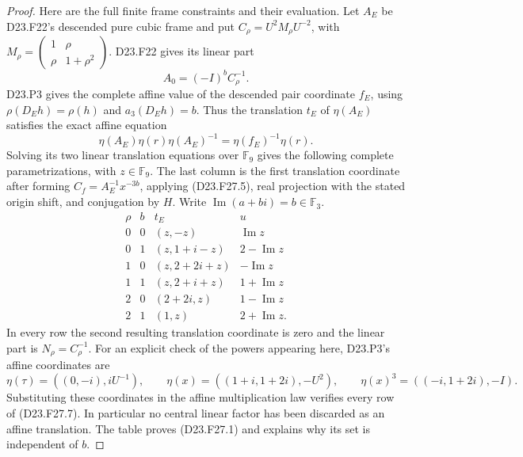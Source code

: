 \begin{proof}
Here are the full finite frame constraints and their evaluation.
Let $A_E$ be D23.F22's descended pure cubic frame and put
$C_\rho=U^2M_\rho U^{-2}$, with
$M_\rho=\left(\begin{smallmatrix}1&\rho\\\rho&1+\rho^2\end{smallmatrix}\right)$.
D23.F22 gives its linear part
\[
                  A_0=(-I)^b C_\rho^{-1}.
\]
D23.P3 gives the complete affine value of the descended pair
coordinate $f_E$, using $\rho(D_Eh)=\rho(h)$ and
$a_3(D_Eh)=b$.  Thus the translation $t_E$ of $\eta(A_E)$
satisfies the exact affine equation
\[
       \eta(A_E)\eta(r)\eta(A_E)^{-1}
                         =\eta(f_E)^{-1}\eta(r).
\tag{D23.F27.6}
\]
Solving its two linear translation equations over $\mathbb F_9$
gives the following complete parametrizations, with $z\in\mathbb F_9$.
The last column is the first translation coordinate after
forming $C_f=A_E^{-1}x^{-3b}$, applying (D23.F27.5), real
projection with the stated origin shift, and conjugation by $H$.
Write $\operatorname{Im}(a+bi)=b\in\mathbb F_3$.
\[
\begin{array}{cc|c|c}
 \rho&b&t_E&u\\\hline
 0&0&(z,-z)&\operatorname{Im}z\\
 0&1&(z,1+i-z)&2-\operatorname{Im}z\\
 1&0&(z,2+2i+z)&-\operatorname{Im}z\\
 1&1&(z,2+i+z)&1+\operatorname{Im}z\\
 2&0&(2+2i,z)&1-\operatorname{Im}z\\
 2&1&(1,z)&2+\operatorname{Im}z.
\end{array}
\tag{D23.F27.7}
\]
In every row the second resulting translation coordinate is
zero and the linear part is $N_\rho=C_\rho^{-1}$.
For an explicit check of the powers appearing here, D23.P3's
affine coordinates are
\[
 \eta(\tau)=((0,-i),iU^{-1}),\qquad
 \eta(x)=((1+i,1+2i),-U^2),\qquad
 \eta(x)^3=((-i,1+2i),-I).
\]
Substituting these coordinates in the affine multiplication
law verifies every row of (D23.F27.7).  In particular no central
linear factor has been discarded as an affine translation.
The table proves (D23.F27.1) and explains why its set is
independent of $b$.


\end{proof}
